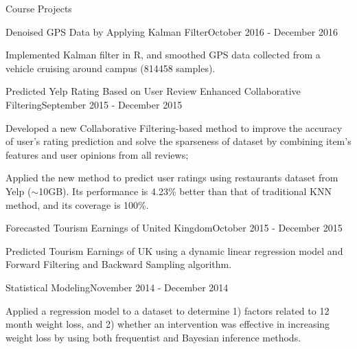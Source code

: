 \documentclass{my_resume} %
\begin{document}

\begin{rSection}{Course Projects}

\begin{rSubsection}{Denoised GPS Data by Applying Kalman Filter}{}{October
    2016 - December 2016}
  \item Implemented Kalman filter in R, and smoothed GPS data collected from a
  vehicle cruising around campus (814458 samples).
\end{rSubsection}

\begin{rSubsection}{Predicted Yelp Rating Based on User Review Enhanced
  Collaborative Filtering}{}{September 2015 - December 2015}
  \item Developed a new Collaborative Filtering-based method to improve the
    accuracy of user's rating prediction and solve the sparseness of dataset by
    combining item's features and user opinions from all reviews;
  \item Applied the new method to predict user ratings using restaurants dataset
    from Yelp ($\sim$10GB). Its performance is 4.23\% better than that of
    traditional KNN method, and its coverage is 100\%.
\end{rSubsection}

\begin{rSubsection}{Forecasted Tourism Earnings of United Kingdom}{}{October
  2015 - December 2015}
  \item Predicted Tourism Earnings of UK using a dynamic linear
    regression model and Forward Filtering and Backward Sampling algorithm.
\end{rSubsection}

\begin{rSubsection}{Statistical Modeling}{}{November 2014 - December 2014}
  \item Applied a regression model to a dataset to determine 1) factors related
  to 12 month weight loss, and 2) whether an intervention was effective in
  increasing weight loss by using both frequentist and Bayesian inference
  methods.
\end{rSubsection}
\end{rSection}

\end{document}
